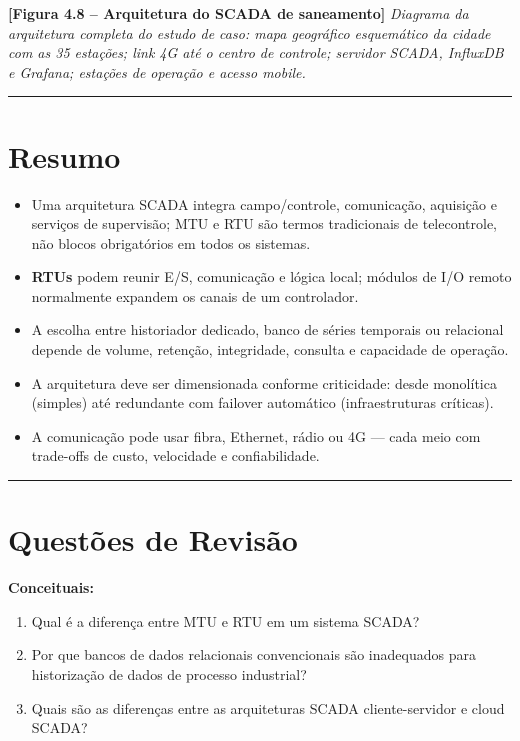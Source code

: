 \begin{caixafigura}

\textbf{{[}Figura 4.8 -- Arquitetura do SCADA de saneamento{]}}
\emph{Diagrama da arquitetura completa do estudo de caso: mapa geográfico esquemático da cidade com as 35 estações; link 4G até o centro de controle; servidor SCADA, InfluxDB e Grafana; estações de operação e acesso mobile.}

\end{caixafigura}

\begin{center}\rule{0.5\linewidth}{0.5pt}\end{center}

\section{Resumo}\label{resumo}

\begin{itemize}
\tightlist
\item
  Uma arquitetura SCADA integra campo/controle, comunicação, aquisição e serviços de supervisão; MTU e RTU são termos tradicionais de telecontrole, não blocos obrigatórios em todos os sistemas.
\item
  \textbf{RTUs} podem reunir E/S, comunicação e lógica local; módulos de I/O remoto normalmente expandem os canais de um controlador.
\item
  A escolha entre historiador dedicado, banco de séries temporais ou relacional depende de volume, retenção, integridade, consulta e capacidade de operação.
\item
  A arquitetura deve ser dimensionada conforme criticidade: desde monolítica (simples) até redundante com failover automático (infraestruturas críticas).
\item
  A comunicação pode usar fibra, Ethernet, rádio ou 4G --- cada meio com trade-offs de custo, velocidade e confiabilidade.
\end{itemize}

\begin{center}\rule{0.5\linewidth}{0.5pt}\end{center}

\section{Questões de Revisão}\label{questuxf5es-de-revisuxe3o}

\textbf{Conceituais:}

\begin{enumerate}
\def\labelenumi{\arabic{enumi}.}
\tightlist
\item
  Qual é a diferença entre MTU e RTU em um sistema SCADA?
\item
  Por que bancos de dados relacionais convencionais são inadequados para historização de dados de processo industrial?
\item
  Quais são as diferenças entre as arquiteturas SCADA cliente-servidor e cloud SCADA?
\end{enumerate}

